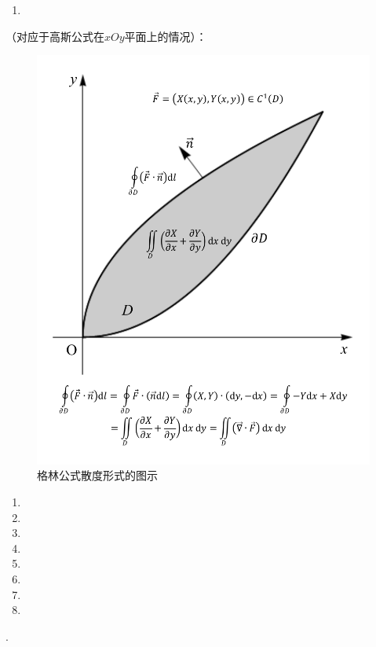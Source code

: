 \documentclass[12pt,UTF8,fleqn]{ctexart}
\begin{document}
\begin{enumerate}
\begin{enumerate}
\begin{enumerate}
\item[]
\end{enumerate}
（对应于高斯公式在$xOy$平面上的情况）：
\begin{figure}[H]
\begin{center}
\includegraphics[height=0.618\textheight,angle=0]{Figures20190613/Green2.pdf}
\end{center}
\caption{格林公式散度形式的图示}
\end{figure}
\begin{enumerate}
\item[]
\item[]
\item[]
\item[]
\item[]
\item[]
\item[]
\item[]
\end{enumerate}
.
\begin{figure}[H]
\begin{center}

\end{center}
\end{figure}
\end{enumerate}
\end{enumerate}
\end{document}
